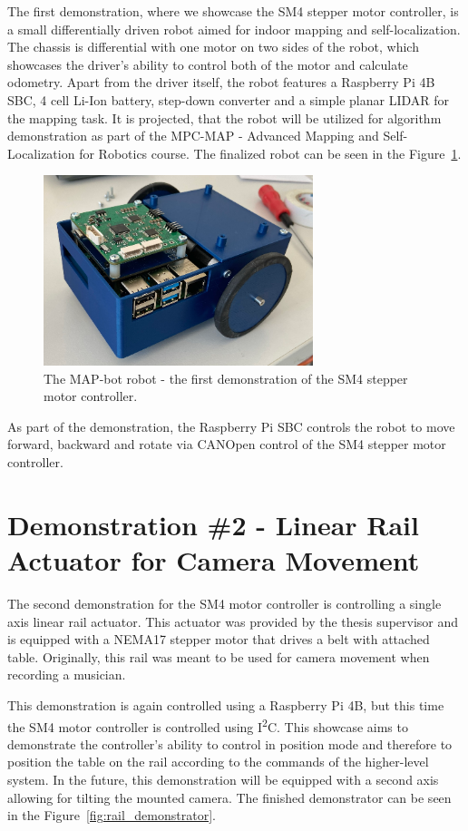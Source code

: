 The first demonstration, where we showcase the SM4 stepper motor controller, is a small differentially driven robot aimed for indoor mapping and self-localization.
The chassis is differential with one motor on two sides of the robot, which showcases the driver's ability to control both of the motor and calculate odometry.
Apart from the driver itself, the robot features a Raspberry Pi 4B SBC, 4 cell Li-Ion battery, step-down converter and a simple planar LIDAR for the mapping task.
It is projected, that the robot will be utilized for algorithm demonstration as part of the MPC-MAP - Advanced Mapping and Self-Localization for Robotics course.
The finalized robot can be seen in the Figure~\ref{fig:map_bot}.

\begin{figure}[H]
    \centering
    \includegraphics[width=0.7\textwidth]{obrazky/map_bot}
    \caption{The MAP-bot robot - the first demonstration of the SM4 stepper motor controller.}
    \label{fig:map_bot}
\end{figure}

As part of the demonstration, the Raspberry Pi SBC controls the robot to move forward, backward and rotate via CANOpen control of the SM4 stepper motor controller.

\section{Demonstration \#2 - Linear Rail Actuator for Camera Movement}
\label{sec:dem2}
The second demonstration for the SM4 motor controller is controlling a single axis linear rail actuator.
This actuator was provided by the thesis supervisor and is equipped with a NEMA17 stepper motor that drives a belt with attached table.
Originally, this rail was meant to be used for camera movement when recording a musician.

This demonstration is again controlled using a Raspberry Pi 4B, but this time the SM4 motor controller is controlled using I\textsuperscript{2}C.
This showcase aims to demonstrate the controller's ability to control in position mode and therefore to position the table on the rail according to the commands of the higher-level system.
In the future, this demonstration will be equipped with a second axis allowing for tilting the mounted camera.
The finished demonstrator can be seen in the Figure~\ref{fig:rail_demonstrator}.

